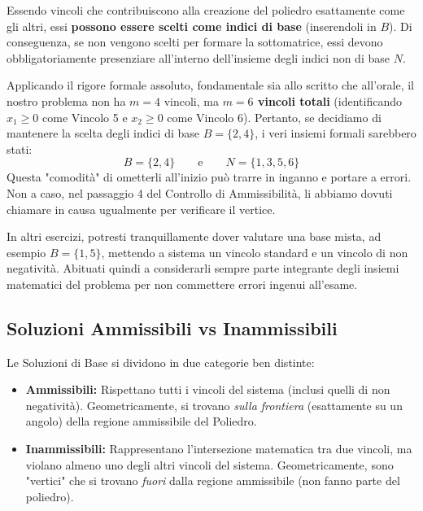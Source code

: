 \documentclass[12pt, a4paper]{article}
\newcommand{\separatore}{\noindent{\color{titlecolor!50}\rule{\textwidth}{0.6pt}}}
\begin{document}
	Essendo vincoli che contribuiscono alla creazione del poliedro esattamente come gli altri, essi \textbf{possono essere scelti come indici di base} (inserendoli in $B$). Di conseguenza, se non vengono scelti per formare la sottomatrice, essi devono obbligatoriamente presenziare all'interno dell'insieme degli indici non di base $N$.
	
	Applicando il rigore formale assoluto, fondamentale sia allo scritto che all'orale, il nostro problema non ha $m=4$ vincoli, ma \textbf{$m=6$ vincoli totali} (identificando $x_1 \geq 0$ come Vincolo 5 e $x_2 \geq 0$ come Vincolo 6). Pertanto, se decidiamo di mantenere la scelta degli indici di base $B = \{2, 4\}$, i veri insiemi formali sarebbero stati:
	\[
	B = \{2, 4\} \qquad \text{e} \qquad N = \{1, 3, 5, 6\}
	\]
	Questa "comodità" di ometterli all'inizio può trarre in inganno e portare a errori. Non a caso, nel passaggio 4 del Controllo di Ammissibilità, li abbiamo dovuti chiamare in causa ugualmente per verificare il vertice. 
	
	In altri esercizi, potresti tranquillamente dover valutare una base mista, ad esempio $B = \{1, 5\}$, mettendo a sistema un vincolo standard e un vincolo di non negatività. Abituati quindi a considerarli sempre parte integrante degli insiemi matematici del problema per non commettere errori ingenui all'esame.
	
	\vspace{0.6cm}
	\separatore
	\vspace{0.4cm}
	
	\subsection*{Soluzioni Ammissibili vs Inammissibili}
	Le Soluzioni di Base si dividono in due categorie ben distinte:
	\begin{itemize}[label=$\circ$, itemsep=4pt, leftmargin=1.5cm]
		\item \textbf{Ammissibili:} Rispettano tutti i vincoli del sistema (inclusi quelli di non negatività). Geometricamente, si trovano \textit{sulla frontiera} (esattamente su un angolo) della regione ammissibile del Poliedro.
		\item \textbf{Inammissibili:} Rappresentano l'intersezione matematica tra due vincoli, ma violano almeno uno degli altri vincoli del sistema. Geometricamente, sono "vertici" che si trovano \textit{fuori} dalla regione ammissibile (non fanno parte del poliedro).
	\end{itemize}
	
\end{document}

